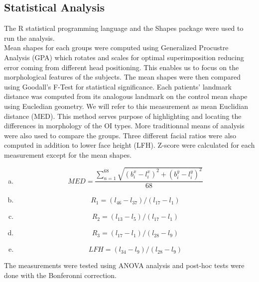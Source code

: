 \documentclass[a0,portrait]{a0poster}
\begin{document}
\begin{multicols}{2}
\section{Statistical Analysis}

The R statistical programming language and the Shapes
package\cite{dryden-shapes} were used to run the analysis.\\
Mean shapes for each groups were computed using
Generalized Procustre Analysis (GPA) which rotates and scales for optimal
superimposition reducing error coming from different head positioning.
This enables us to focus on the morphological features of the subjects.
The mean shapes were then compared using Goodall's F-Test for statistical
significance.
Each patients' landmark distance was computed from its analogous landmark on
the control mean shape using Eucledian geometry. We will refer to this
measurement as mean Euclidian distance (MED).
This method serves purpose of highlighting and locating the differences in
morphology of the OI types.
More traditionnal means of analysis were also used to compare the groups.
Three different facial ratios  were also computed in addition to lower face height (LFH).
Z-score were calculated for each measurement except for the mean shapes.

\setlength{\belowdisplayskip}{0pt} \setlength{\belowdisplayshortskip}{0pt}
\setlength{\abovedisplayskip}{0pt} \setlength{\abovedisplayshortskip}{0pt}

\begin{center}
  \begin{enumerate}[(a)]
\item \[MED=\dfrac{\sum_{n=1}^{68} \sqrt{(b_i^x-l_i^x)^2+(b_i^y-l_i^y)^2}}{68}\]
\item \[R_1=(l_{46}-l_{37})/(l_{17}-l_1)\]
\item \[R_2=(l_{13}-l_5)/(l_{17}-l_1)\]
\item \[R_3=(l_{17}-l_1)/(l_{28}-l_9)\]
\item \[LFH=(l_{34}-l_{9})/(l_{28}-l_{9})\]
\end{enumerate}
\end{center}

The measurements were tested using ANOVA analysis and post-hoc tests were done
with the Bonferonni correction.




\end{multicols}
\end{document}
